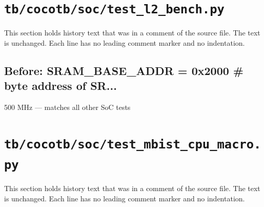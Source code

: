 \section{\texttt{tb/cocotb/soc/test\_l2\_bench.py}}\label{cr:suite:soc-test-l2-bench}

This section holds history text that was in a comment of the source file. The text is unchanged. Each line has no leading comment marker and no indentation.

\begin{record}

\subsection*{Before: SRAM\_BASE\_ADDR = 0x2000             \# byte address of SR...}

\begin{textblock}
500 MHz — matches all other SoC tests
\end{textblock}

\end{record}

\section{\texttt{tb/cocotb/soc/test\_mbist\_cpu\_macro.py}}\label{cr:suite:soc-test-mbist-cpu-macro}

This section holds history text that was in a comment of the source file. The text is unchanged. Each line has no leading comment marker and no indentation.

